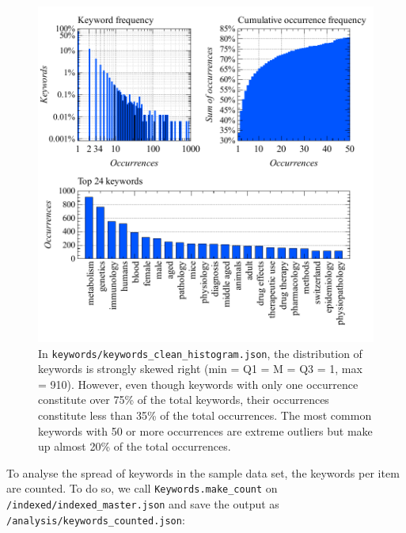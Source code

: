 \begin{figure}
\centering
\includegraphics{images/keywords_clean_histogram_abc.pdf}
\caption{In \texttt{keywords/keywords\_clean\_histogram.json}, the
distribution of keywords is strongly skewed right (min = Q1 = M = Q3 =
1, max = 910). However, even though keywords with only one occurrence
constitute over 75\% of the total keywords, their occurrences constitute
less than 35\% of the total occurrences. The most common keywords with
50 or more occurrences are extreme outliers but make up almost 20\% of
the total occurrences.}
\end{figure}

To analyse the spread of keywords in the sample data set, the keywords
per item are counted. To do so, we call \texttt{Keywords.make\_count} on
\texttt{/indexed/indexed\_master.json} and save the output as
\texttt{/analysis/keywords\_counted.json}:

\begin{Shaded}
\begin{Highlighting}[]
\OperatorTok{=}\NormalTok{)}
\OperatorTok{=}
\NormalTok{)}
\end{Highlighting}
\end{Shaded}

